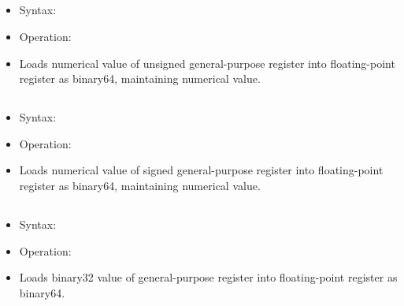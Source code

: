 \subsection{}

\begin{itemize}
  \item Syntax: 
  \item Operation: 
  \item Loads numerical value of unsigned general-purpose register
         into floating-point register  as binary64,
        maintaining numerical value.
\end{itemize}

\subsection{}

\begin{itemize}
  \item Syntax: 
  \item Operation: 
  \item Loads numerical value of signed general-purpose register
         into floating-point register  as binary64,
        maintaining numerical value.
\end{itemize}

\subsection{}

\begin{itemize}
  \item Syntax: 
  \item Operation: 
  \item Loads binary32 value of general-purpose register
         into floating-point register  as binary64.
\end{itemize}

\subsection{}

